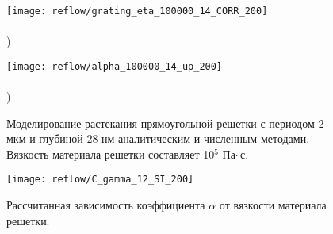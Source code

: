 \begin{figure}[t]
	\begin{minipage}{0.5\textwidth}
		\texttt{[image: reflow/grating\_eta\_100000\_14\_CORR\_200]} \\
		\vspace{-28.5ex} \\ ) \\ \vspace{28.5ex}
	\end{minipage}
	\begin{minipage}{0.5\textwidth}
		\hspace{-1em} \texttt{[image: reflow/alpha\_100000\_14\_up\_200]} \\
		\vspace{-28.5ex} \\ ) \\ \vspace{28.5ex}
	\end{minipage}
	\vspace{-3.5em}
	\caption{Моделирование растекания прямоугольной решетки с периодом 2 мкм и глубиной 28 нм аналитическим и численным методами. Вязкость материала решетки составляет 10$^\text{5}$ Па\:$\cdot$\,с.}
	\label{fig:reflow_1}
\end{figure}

\begin{figure}[h]
	\begin{center}
		\texttt{[image: reflow/С\_gamma\_12\_SI\_200]}
	\end{center}
	\vspace{-1.2em}
	\caption{Рассчитанная зависимость коэффициента $\alpha$ от вязкости материала решетки.}
	\label{fig:eta_alpha}
\end{figure}

